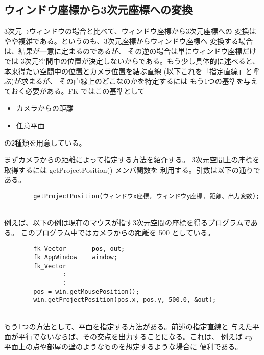 \subsection{ウィンドウ座標から3次元座標への変換}
3次元→ウィンドウの場合と比べて、ウィンドウ座標から3次元座標への
変換はやや複雑である。というのも、3次元座標からウィンドウ座標へ
変換する場合は、結果が一意に定まるのであるが、
その逆の場合は単にウィンドウ座標だけでは
3次元空間中の位置が決定しないからである。もう少し具体的に述べると、
本来得たい空間中の位置とカメラ位置を結ぶ直線
(以下これを「指定直線」と呼ぶ)が求まるが、
その直線上のどこなのかを特定するには
もう1つの基準を与えておく必要がある。FK ではこの基準として
\begin{itemize}
 \item カメラからの距離
 \item 任意平面
\end{itemize}
の2種類を用意している。

まずカメラからの距離によって指定する方法を紹介する。
3次元空間上の座標を取得するには getProjectPosition() メンバ関数を
利用する。引数は以下の通りである。
\\
\begin{screen}
\begin{verbatim}
        getProjectPosition(ウィンドウx座標, ウィンドウy座標, 距離、出力変数);
\end{verbatim}
\end{screen}
~ \\
例えば、以下の例は現在のマウスが指す3次元空間の座標を得るプログラムである。
このプログラム中ではカメラからの距離を 500 としている。
\\
\begin{breakbox}
\begin{verbatim}
        fk_Vector       pos, out;
        fk_AppWindow    window;
        fk_Vector       
                :
                :
        pos = win.getMousePosition();
        win.getProjectPosition(pos.x, pos.y, 500.0, &out);
\end{verbatim}
\end{breakbox}
~ \\
もう1つの方法として、平面を指定する方法がある。前述の指定直線と
与えた平面が平行でないならば、その交点を出力することになる。これは、
例えば \(xy\) 平面上の点や部屋の壁のようなものを想定するような場合に
便利である。

